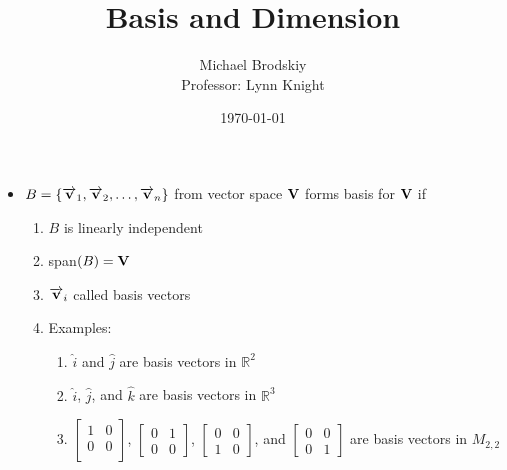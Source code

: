 \documentclass[12pt]{article}
\title{Basis and Dimension}
\date{\today}
\author{Michael Brodskiy\\ \small Professor: Lynn Knight}
\begin{document}
\maketitle

\begin{itemize}

  \item $B=\left\{ \overrightarrow{\bold{v}}_1,\overrightarrow{\bold{v}}_2,\dots,\overrightarrow{\bold{v}}_n \right\}$ from vector space $\bold{V}$ forms basis for $\bold{V}$ if

    \begin{enumerate}

      \item $B$ is linearly independent

      \item span$(B)=\bold{V}$

      \item $\overrightarrow{\bold{v}}_i$ called basis vectors

      \item Examples:

        \begin{enumerate}

          \item $\hat{i}$ and $\hat{j}$ are basis vectors in $\mathbb{R}^2$

          \item $\hat{i}$, $\hat{j}$, and $\hat{k}$ are basis vectors in $\mathbb{R}^3$

          \item $\begin{bmatrix}1 & 0\\ 0 & 0\\\end{bmatrix}$, $\begin{bmatrix} 0 & 1\\ 0 & 0 \end{bmatrix}$, $\begin{bmatrix} 0 & 0\\ 1 & 0 \end{bmatrix}$, and $\begin{bmatrix} 0 & 0\\ 0 & 1 \end{bmatrix}$ are basis vectors in $M_{2,2}$

        \end{enumerate}

    \end{enumerate}


\end{itemize}
\end{document}

